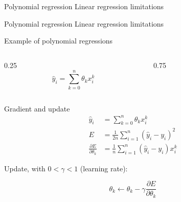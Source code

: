 
\begin{frame}{Polynomial regression}
  Linear regression limitations
\end{frame}

\begin{frame}{Polynomial regression}
  Linear regression limitations
\end{frame}

\begin{frame}{Example of polynomial regressions}
  \begin{columns}
    \begin{column}{0.25\tw}
      \[
        \hat{y}_i = \sum_{k = 0}^n \theta_k x_i^k
      \]
    \end{column}
    \begin{column}{0.75\tw}
    \end{column}
  \end{columns}
\end{frame}

\begin{frame}{Gradient and update}
  \begin{align*}
    \hat{y}_i & = \sum_{k = 0}^n \theta_k x_i^k \\
    E & = \frac{1}{2n} \sum_{i=1}^n (\hat{y}_i - y_i)^2 \\
    \frac{\partial{E}}{\partial{\theta_k}} & = \frac{1}{n} \sum_{i=1}^n (\hat{y}_i - y_i) x_i^k
  \end{align*}

  Update, with $0 < \gamma < 1$ (learning rate):

  \[
    \theta_k \leftarrow \theta_k - \gamma\frac{\partial{E}}{\partial{\theta_k}}
  \]
\end{frame}
